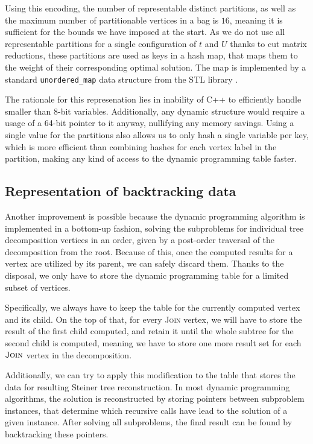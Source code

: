 \documentclass[thesis=M,english,hidelinks]{FITthesis}[2012/10/20]
\theoremstyle{definition}
\begin{document}
Using this encoding, the number of representable distinct partitions, as well as the maximum number of partitionable
vertices in a bag is $16$, meaning it is sufficient for the bounds we have imposed at the start. As we do not use all
representable partitions for a single configuration of $t$ and $U$ thanks to cut matrix reductions, these partitions are
used as keys in a hash map, that maps them to the weight of their corresponding optimal solution. The map is implemented
by a standard \texttt{unordered\_map} data structure from the STL library \cite{STL}.

The rationale for this represenation lies in inability of C++ to efficiently handle smaller than 8-bit variables.
Additionally, any dynamic structure would require a usage of a 64-bit pointer to it anyway, nullifying any memory
savings. Using a single value for the partitions also allows us to only hash a single variable per key, which is more
efficient than combining hashes for each vertex label in the partition, making any kind of access to the dynamic
programming table faster.

\subsection{Representation of backtracking data}
\label{sec:backtrack}

Another improvement is possible because the dynamic programming algorithm is implemented in a bottom-up fashion, solving
the subproblems for individual tree decomposition vertices in an order, given by a post-order traversal of the
decomposition from the root. Because of this, once the computed results for a vertex are utilized by its parent, we can
safely discard them. Thanks to the disposal, we only have to store the dynamic programming table for a limited subset of
vertices.

Specifically, we always have to keep the table for the currently computed vertex and its child. On the top of that, for
every \textsc{Join} vertex, we will have to store the result of the first child computed, and retain it until the whole
subtree for the second child is computed, meaning we have to store one more result set for each $\textsc{Join}$ vertex
in the decomposition.

Additionally, we can try to apply this modification to the table that stores the data for resulting Steiner tree
reconstruction. In most dynamic programming algorithms, the solution is reconstructed by storing pointers between
subproblem instances, that determine which recursive calls have lead to the solution of a given instance. After solving
all subproblems, the final result can be found by backtracking these pointers.
\end{document}
